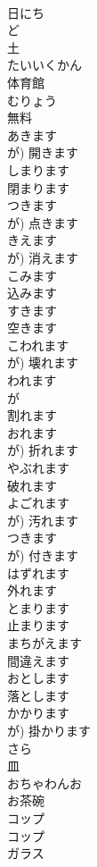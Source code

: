 \documentclass[8pt]{extreport}
\begin{document}
\begin{CJK}{UTF8}{min}
\\	日にち		
\\	ど	
\\	土		
\\	たいいくかん	
\\	体育館		
\\	むりょう	
\\	無料		
\\	あきます	
\\	が)	開きます	
\\	しまります	
\\	閉まります	
\\	つきます	
\\	が)	点きます	
\\	きえます	
\\	が)	消えます	
\\	こみます	
\\	込みます	
\\	すきます	
\\	空きます		
\\	こわれます	
\\	が)	壊れます	
\\	われます	
\\	が 
\\	割れます	
\\	おれます	
\\	が)	折れます		
\\	やぶれます	
\\	破れます	
\\	よごれます	
\\	が)	汚れます	
\\	つきます	
\\	が)	付きます		
\\	はずれます	
\\	外れます		
\\	とまります	
\\	止まります	
\\	まちがえます	
\\	間違えます	
\\	おとします	
\\	落とします	
\\	かかります	
\\	が)	掛かります		
\\	さら	
\\	皿	
\\	おちゃわんお	
\\	お茶碗		
\\	コップ	
\\	コップ	
\\	ガラス	

\end{CJK}
\end{document}
